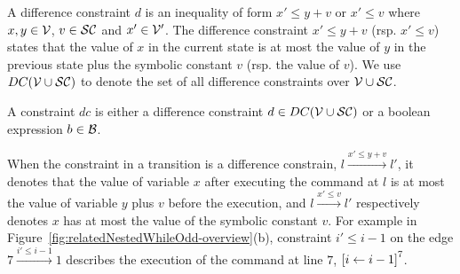 \begin{defn}
A difference constraint $d$ is an inequality of
form $x' \leq y + v$ or $x' \leq v$ where $x, y \in \mathcal{V} $, $v \in \mathcal{SC}$ and $x' \in \mathcal{V}'$. The difference constraint
$x' \leq y + v$ (rsp. $x' \leq v$) states that the value of $x$ in the current state is
at most the value of $y$ in the previous state plus the symbolic constant $v$ (rsp. the value of $v$).
We use $DC(\mathcal{V} \cup \mathcal{SC})$ to denote the set of all difference constraints over $\mathcal{V} \cup \mathcal{SC}$.
\end{defn}

\begin{defn}[Constraints]
A constraint $dc$
is either a
difference constraint $d \in DC(\mathcal{V} \cup \mathcal{SC})$ or a boolean expression $b \in \mathcal{B}$.
\end{defn}

When the constraint in a transition is a difference constrain, $l \xrightarrow{x' \leq y + v} l'$,
it denotes that
the value of variable $x$
after executing the command at $l$ is at most
the value of variable $y$ plus $v$ before the execution,
and $l \xrightarrow{x' \leq v} l'$ respectively denotes
$x$ has at most
the value of the symbolic constant $v$.
For example in Figure~\ref{fig:relatedNestedWhileOdd-overview}(b), constraint $i' \leq i - 1$ on the edge $7 \xrightarrow{i' \leq i - 1} 1$
describes the execution of
 the command at line $7$, 
$\clabel{\assign{i}{i - 1}}^{7}$. 

